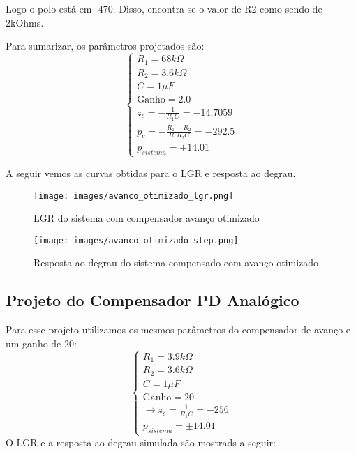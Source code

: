 Logo o polo está em -470. Disso, encontra-se o valor de R2 como sendo de 2kOhms.

Para sumarizar, os parâmetros projetados são:
\begin{equation}
    \left\{ \begin{array}{l}
     R_1 = 68k \Omega  \\
     R_2 = 3.6k \Omega  \\
     C = 1 \mu F \\ 
     \mbox{Ganho} = 2.0 \\
     z_{c} = -\frac{1}{R_1C} =  -14.7059 \\
     p_{c} = -\frac{R_1 + R_2}{R_1R_2C} = -292.5\\
     p_{sistema} = \pm 14.01
    \end{array}\right.
\end{equation}

A seguir vemos as curvas obtidas para o LGR e resposta ao degrau.

\begin{figure}[H]
\centering
\texttt{[image: images/avanco\_otimizado\_lgr.png]}
\caption{LGR do sistema com compensador avanço otimizado}
\label{fig:pd-normal-lgr}
\end{figure}

\begin{figure}[H]
\centering
\texttt{[image: images/avanco\_otimizado\_step.png]}
\caption{Resposta ao degrau do sistema compensado com avanço  otimizado}
\label{fig:pd-normal-step}
\end{figure}

\subsection{Projeto do Compensador PD Analógico}
Para esse projeto utilizamos os mesmos parâmetros do compensador de avanço e um ganho de 20:
\begin{equation}
    \left\{ \begin{array}{l}
     R_1 = 3.9k \Omega  \\
     R_2 = 3.6k \Omega  \\
     C = 1 \mu F \\ 
     \mbox{Ganho} = 20 \\
     \rightarrow z_{c} = \frac{1}{R_1C} = -256 \\
     p_{sistema} = \pm 14.01
    \end{array}\right.
\end{equation}
O LGR e a resposta ao degrau simulada são mostrads a seguir:

